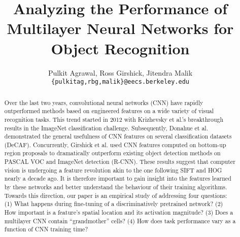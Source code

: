 \documentclass[runningheads]{llncs}
\begin{document}
\pagestyle{headings}
\mainmatter
\title{Analyzing the Performance of Multilayer Neural Networks for Object Recognition} %




\author{Pulkit Agrawal, Ross Girshick, Jitendra Malik\\
\texttt{\{pulkitag,rbg,malik\}@eecs.berkeley.edu}}


\maketitle

\begin{abstract}
Over the last two years, convolutional neural networks (CNN) have rapidly outperformed methods based on engineered features on a wide variety of visual recognition tasks. This trend started in 2012 with Krizhevsky et al.'s breakthrough results in the ImageNet classification challenge. Subsequently, Donahue et al. demonstrated the general usefulness of CNN features on several classification datasets (DeCAF). Concurrently, Girshick et al. used CNN features computed on bottom-up region proposals to dramatically outperform existing object detection methods on PASCAL VOC and ImageNet detection (R-CNN). These results suggest that computer vision is undergoing a feature revolution akin to the one following SIFT and HOG nearly a decade ago. It is therefore important to gain insight into the features learned by these networks and better understand the behaviour of their training algorithms. Towards this direction, our paper is an empirical study of addressing four questions: 
(1) What happens during fine-tuning of a discriminatively pretrained network? 
(2) How important is a feature's spatial location and its activation magnitude?
(3) Does a multilayer CNN contain ``grandmother'' cells?
(4) How does task performance vary as a function of CNN training time?

\end{abstract}
\end{document}
